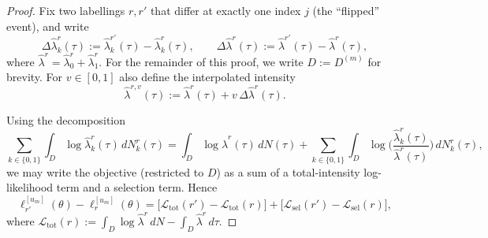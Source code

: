 \documentclass{statsoc}
\newcommand{\1}{\mathbbm{1}}
\begin{document}
\begin{proof}
Fix two labellings $r,r'$ that differ at exactly one index $j$ (the ``flipped'' event), and write
\[
\Delta\widehat\lambda_k^r(\tau):=\widehat\lambda_k^{r'}(\tau)-\widehat\lambda_k^{r}(\tau),\qquad
\Delta\widehat\lambda^{r}(\tau):=\widehat\lambda^{r'}(\tau)-\widehat\lambda^{r}(\tau),
\]
where $\widehat\lambda^{r}=\widehat\lambda_0^{r}+\widehat\lambda_1^{r}$. For the remainder of this proof, we write $D:=D^{(m)}$ for brevity. For $v\in[0,1]$ also define the interpolated intensity
\[
\widehat\lambda^{r,v}(\tau):=\widehat\lambda^{r}(\tau)+v\,\Delta\widehat\lambda^{r}(\tau).
\]

Using the decomposition
\[
\sum_{k\in\{0,1\}}\int_D \log\widehat\lambda_k^r(\tau)\,dN_k^r(\tau)
=
\int_D \log\widehat\lambda^{r}(\tau)\,dN(\tau)
+
\sum_{k\in\{0,1\}}\int_D \log\!\Big(\frac{\widehat\lambda_k^r(\tau)}{\widehat\lambda^{r}(\tau)}\Big)\,dN_k^r(\tau),
\]
we may write the objective (restricted to $D$) as a sum of a total-intensity log-likelihood term and a selection term. Hence
\[
\ell_{r'}^{[u_m]}(\theta)-\ell_r^{[u_m]}(\theta)
=
\Big[\mathcal L_{\mathrm{tot}}(r')-\mathcal L_{\mathrm{tot}}(r)\Big]
+
\Big[\mathcal L_{\mathrm{sel}}(r')-\mathcal L_{\mathrm{sel}}(r)\Big],
\]
where $\mathcal L_{\mathrm{tot}}(r):=\int_D \log\widehat\lambda^{r}\,dN-\int_D \widehat\lambda^{r}\,d\tau$.


\end{proof}
\end{document}

